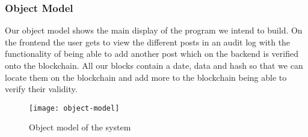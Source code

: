 \subsubsection{Object Model}
Our object model shows the main display of the program we intend to build. 
On the frontend the user gets to view the different posts in an audit log 
with the functionality of being able to add another post which on the backend 
is verified onto the blockchain. All our blocks contain a date,
data and hash so that we can locate them on the blockchain 
and add more to the blockchain being able to verify their validity.
\begin{figure}[h]
\centering %
\texttt{[image: object-model]} %
\caption{Object model of the system}
\label{fig: object-model} %
\end{figure}
